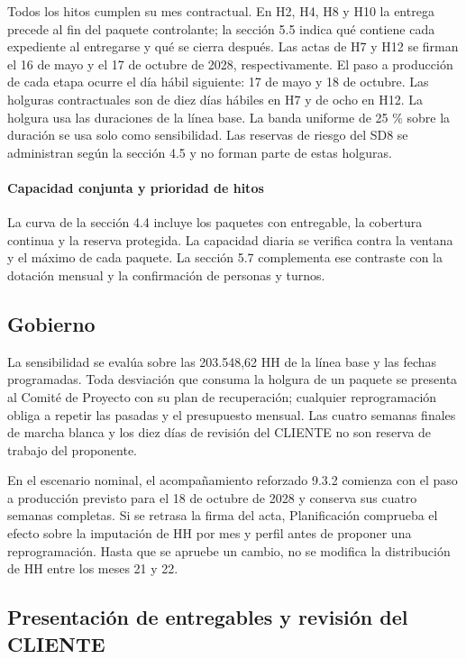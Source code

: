 
Todos los hitos cumplen su mes contractual. En H2, H4, H8 y H10 la entrega precede al fin del paquete controlante; la sección 5.5 indica qué contiene cada expediente al entregarse y qué se cierra después. Las actas de H7 y H12 se firman el 16 de mayo y el 17 de octubre de 2028, respectivamente. El paso a producción de cada etapa ocurre el día hábil siguiente: 17 de mayo y 18 de octubre. Las holguras contractuales son de diez días hábiles en H7 y de ocho en H12. La holgura usa las duraciones de la línea base. La banda uniforme de 25 \% sobre la duración se usa solo como sensibilidad. Las reservas de riesgo del SD8 se administran según la sección 4.5 y no forman parte de estas holguras.

\paragraph{Capacidad conjunta y prioridad de hitos}
La curva de la sección 4.4 incluye los paquetes con entregable, la cobertura continua y la reserva protegida. La capacidad diaria se verifica contra la ventana y el máximo de cada paquete. La sección 5.7 complementa ese contraste con la dotación mensual y la confirmación de personas y turnos.

\subsection{Gobierno}

La sensibilidad se evalúa sobre las 203.548,62 HH de la línea base y las fechas programadas. Toda desviación que consuma la holgura de un paquete se presenta al Comité de Proyecto con su plan de recuperación; cualquier reprogramación obliga a repetir las pasadas y el presupuesto mensual. Las cuatro semanas finales de marcha blanca y los diez días de revisión del CLIENTE no son reserva de trabajo del proponente.

En el escenario nominal, el acompañamiento reforzado 9.3.2 comienza con el paso a producción previsto para el 18 de octubre de 2028 y conserva sus cuatro semanas completas. Si se retrasa la firma del acta, Planificación comprueba el efecto sobre la imputación de HH por mes y perfil antes de proponer una reprogramación. Hasta que se apruebe un cambio, no se modifica la distribución de HH entre los meses 21 y 22.

\subsection{Presentación de entregables y revisión del CLIENTE}

